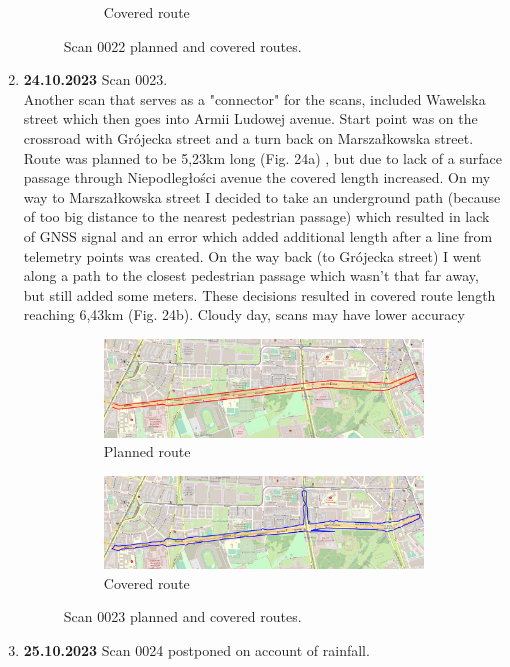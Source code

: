 \documentclass[a4paper,12pt]{book}
\begin{document}
\begin{enumerate}
\begin{figure}[H]
\begin{subfigure}{.90\textwidth}
			\caption{Covered route}
			\label{fig:b22}
		\end{subfigure}
		\caption{Scan 0022 planned and covered routes.}
		\label{fig:fig22}
	\end{figure}
	\pagebreak
	\item \textbf{24.10.2023} Scan 0023. \\
	 Another scan that serves as a "connector" for the scans, included Wawelska street which then goes into Armii Ludowej avenue. Start point was on the crossroad with Grójecka street and a turn back on Marszałkowska street. Route was planned to be 5,23km long (Fig. 24a) , but due to lack of a surface passage through Niepodległości avenue the covered length increased. On my way to Marszałkowska street I decided to take an underground path (because of too big distance to the nearest pedestrian passage) which resulted in lack of GNSS signal and an error which added additional length after a line from telemetry points was created. On the way back (to Grójecka street) I went along a path to the closest pedestrian passage which wasn't that far away, but still added some meters. These decisions resulted in covered route length reaching 6,43km (Fig. 24b). Cloudy day, scans may have lower accuracy
	\pagebreak
	\begin{figure}[H]
		\centering
		\begin{subfigure}{.90\textwidth}
			\centering
			\includegraphics[width=1\linewidth]{route_p23}
			\caption{Planned route}
			\label{fig:a23}
		\end{subfigure}%
		\linebreak
		\begin{subfigure}{.90\textwidth}
			\centering
			\includegraphics[width=1\linewidth]{route_c23}
			\caption{Covered route}
			\label{fig:b23}
		\end{subfigure}
		\caption{Scan 0023 planned and covered routes.}
		\label{fig:fig23}
	\end{figure}
	\pagebreak
	\item \textbf{25.10.2023} Scan 0024 postponed on account of rainfall.


\end{enumerate}
\end{document}
